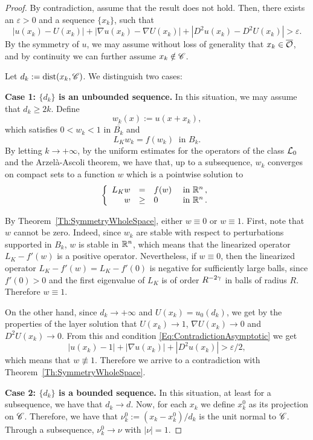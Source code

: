 \begin{proof}
By contradiction, assume that the result does not hold. Then, there exists an $\varepsilon>0$ and a sequence $\{x_k\}$, such that
\begin{equation}
\label{Eq:ContradictionAsymptotic}
|u(x_k)-U(x_k)|+|\nabla u(x_k)-\nabla U(x_k)|+|D^2u(x_k)-D^2U(x_k)| > \varepsilon.
\end{equation}
By the symmetry of $u$, we may assume without loss of generality that $x_k \in \overline{\mathcal{O}}$, and by continuity we can further assume $ x_k \notin \mathscr{C}$. 

Let $d_k:=\operatorname{dist}(x_k,\mathscr{C})$. We distinguish two cases:

\textbf{Case 1: $\{d_k\}$ is an unbounded sequence.} In this situation, we may assume that $d_k \geq 2k$. Define
$$
w_k(x) := u(x+x_k), 
$$
which satisfies $0<w_k<1$ in $\overline{B_k}$ and
$$
L_K w_k = f(w_k) \ \textrm{ in } B_k.
$$
By letting $k\to +\infty$, by the uniform estimates for the operators of the class $\mathcal{L}_0$ and the Arzelà-Ascoli theorem, we have that, up to a subsequence, $w_k$ converges on compact sets to a function $w$ which is a pointwise solution to
$$
\left\{\begin{array}{rcll}
L_K  w &=& f(w) & \textrm{ in }\mathbb{R}^n\,,\\
w &\geq& 0 & \textrm{ in } \mathbb{R}^n\,.
\end{array} \right.
$$

By Theorem~\ref{Th:SymmetryWholeSpace}, either $w\equiv 0$ or $w\equiv 1$. First, note that $w$ cannot be zero. Indeed, since $w_k$ are stable with respect to perturbations supported in $B_k$, $w$ is stable in $\mathbb{R}^n$, which means that the linearized operator $L_K-f'(w)$ is a positive operator. Nevertheless, if $w\equiv 0$, then the linearized operator $L_K-f'(w) = L_K-f'(0)$ is negative for sufficiently large balls, since $f'(0)>0$ and the first eigenvalue of $L_K$ is of order $R^{-2\gamma}$ in balls of radius $R$. Therefore $w\equiv 1$. 

On the other hand, since $d_k\rightarrow +\infty$ and $U(x_k) =  u_0(d_k)$, we get by the properties of the layer solution  that $U(x_k) \rightarrow 1$, $\nabla U(x_k) \rightarrow 0$ and $D^2U(x_k) \rightarrow 0$. From this and condition \eqref{Eq:ContradictionAsymptotic} we get
$$
|u(x_k)-1|+|\nabla u(x_k)|+|D^2u(x_k)| > \varepsilon/2,
$$
which means that $w \not\equiv 1$. Therefore we arrive to a contradiction with Theorem~\ref{Th:SymmetryWholeSpace}.

\textbf{Case 2: $\{d_k\}$ is a bounded sequence.}
In this situation, at least for a subsequence, we have that $d_k \rightarrow d$. Now, for each $x_k$ we define $x_k^0$ as its projection on $\mathscr{C}$. Therefore, we have that $ \nu_k^0 := (x_k-x_k^0)/d_k$ is the unit normal to $\mathscr{C}$. Through a subsequence, $ \nu_k^0 \rightarrow \nu$ with $|\nu|=1$.


\end{proof}
